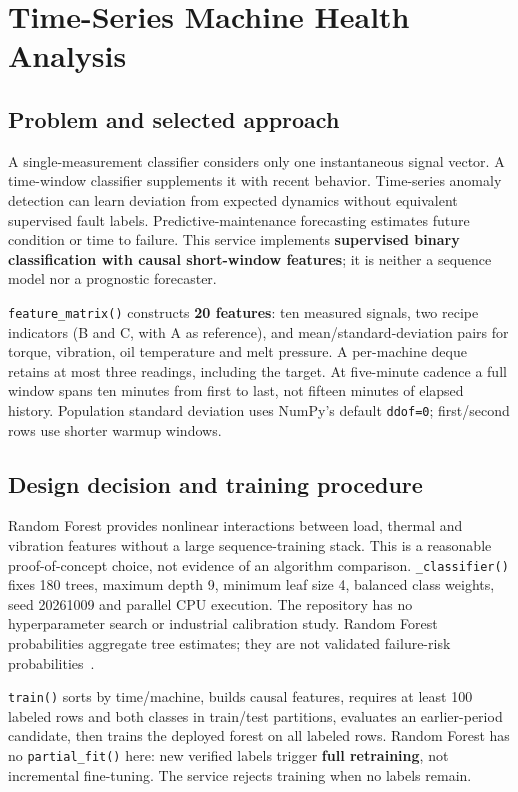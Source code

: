 \chapter{Time-Series Machine Health Analysis}
\section{Problem and selected approach}
A single-measurement classifier considers only one instantaneous signal vector. A time-window classifier supplements it with recent behavior. Time-series anomaly detection can learn deviation from expected dynamics without equivalent supervised fault labels. Predictive-maintenance forecasting estimates future condition or time to failure. This service implements \textbf{supervised binary classification with causal short-window features}; it is neither a sequence model nor a prognostic forecaster.

\texttt{feature\_matrix()} constructs \textbf{20 features}: ten measured signals, two recipe indicators (B and C, with A as reference), and mean/standard-deviation pairs for torque, vibration, oil temperature and melt pressure. A per-machine deque retains at most three readings, including the target. At five-minute cadence a full window spans ten minutes from first to last, not fifteen minutes of elapsed history. Population standard deviation uses NumPy's default \texttt{ddof=0}; first/second rows use shorter warmup windows.
\section{Design decision and training procedure}
Random Forest provides nonlinear interactions between load, thermal and vibration features without a large sequence-training stack. This is a reasonable proof-of-concept choice, not evidence of an algorithm comparison. \texttt{\_classifier()} fixes 180 trees, maximum depth 9, minimum leaf size 4, balanced class weights, seed 20261009 and parallel CPU execution. The repository has no hyperparameter search or industrial calibration study. Random Forest probabilities aggregate tree estimates; they are not validated failure-risk probabilities~\cite{rfdocs}.

\texttt{train()} sorts by time/machine, builds causal features, requires at least 100 labeled rows and both classes in train/test partitions, evaluates an earlier-period candidate, then trains the deployed forest on all labeled rows. Random Forest has no \texttt{partial\_fit()} here: new verified labels trigger \textbf{full retraining}, not incremental fine-tuning. The service rejects training when no labels remain.

